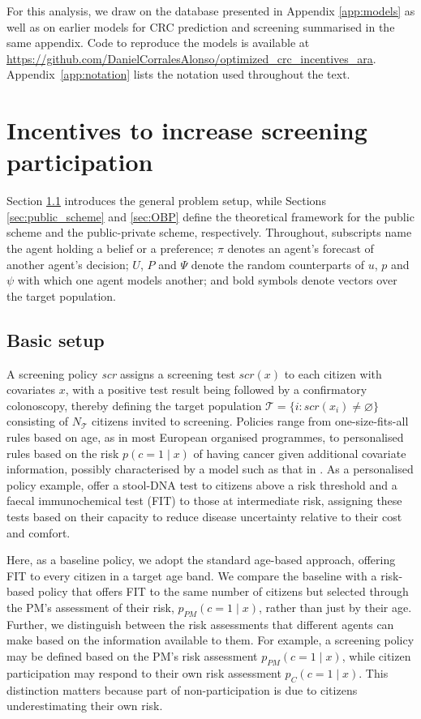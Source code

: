 \documentclass[12pt]{article}
\begin{document}
For this analysis, we draw on the database presented in Appendix \ref{app:models} as well as on earlier models for CRC prediction \citep{corrales2024colorectal} and screening \citep{corrales2025decision} summarised in the same appendix. Code to reproduce the models is available at \url{https://github.com/DanielCorralesAlonso/optimized_crc_incentives_ara}. Appendix~\ref{app:notation} lists the notation used throughout the text.

\section{Incentives to increase screening participation} \label{sec:incentive_problem_definition}
Section \ref{sec:basic_setup} introduces the general problem setup, while Sections \ref{sec:public_scheme} and \ref{sec:OBP} define the theoretical framework for the public scheme and the public-private scheme, respectively. Throughout, subscripts name the agent holding a belief or a preference; $\pi$ denotes an agent's forecast of another agent's decision; $U$, $P$ and $\Psi$ denote the random counterparts of $u$, $p$ and $\psi$ with which one agent models another; and bold symbols denote vectors over the target population. 

\subsection{Basic setup} \label{sec:basic_setup}
A screening policy \emph{scr} assigns a screening test $scr(x)$ to each citizen with covariates $x$, with a positive test result being followed by a confirmatory colonoscopy, thereby defining the target population $\mathcal{T} = \{ i: scr(x_i) \neq \varnothing \}$ consisting of $N_{\mathcal{T}}$ citizens invited to screening. Policies range from one-size-fits-all rules based on age, as in most European organised programmes, to personalised rules based on the risk  $p( c = 1 \mid x)$ of having cancer given additional covariate information, possibly characterised by a model such as that in \cite{corrales2024colorectal}. As a personalised policy example, \cite{corrales2025decision} offer a stool-DNA test to citizens above a risk threshold and a faecal immunochemical test (FIT) to those at intermediate risk, assigning these tests based on their capacity to reduce disease uncertainty relative to their cost and comfort.

Here, as a baseline policy, we adopt the standard age-based approach, offering FIT to every citizen in a target age band. We compare the baseline with a risk-based policy that offers FIT to the same number of citizens but selected through the PM's assessment of their risk, $p_{PM}(c = 1 \mid x)$, rather than just by their age. Further, we distinguish between the risk assessments that different agents can make based on the information available to them. For example, a screening policy may be defined based on the PM's risk assessment $p_{PM}(c = 1 \mid x)$, while citizen participation may respond to their own risk assessment $p_C(c=1 \mid x)$. This distinction matters because part of non-participation is due to citizens underestimating their own risk.
\end{document}
